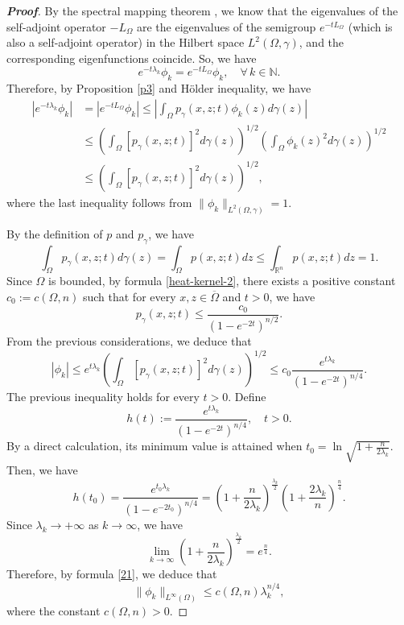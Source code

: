 \documentclass[12pt]{amsart}
\newcommand{\R}{\mathbb R}
\newcommand{\N}{\mathbb N}
\newcommand{\1}{\mathbf 1}
\begin{document}
\begin{proof}[\bf Proof]
 By the spectral mapping theorem \cite[Theorem 2.4]{Pazy1983}, we know that the eigenvalues of the self-adjoint operator $-L_\Omega$ are the eigenvalues of the semigroup $e^{-tL_\Omega}$ (which is also a self-adjoint operator) in the Hilbert space $L^2(\Omega,\gamma)$, and the corresponding eigenfunctions coincide. So, we have
\begin{equation}\label{Section5-1}
e^{-t\lambda_k}\phi_k=e^{-tL_\Omega} \phi_k,\quad\forall\, k\in\N.
\end{equation}
Therefore, by Proposition \ref{p3} and H\"{o}lder inequality, we have
\begin{align*}
|e^{-t\lambda_k}\phi_k|&=|e^{-tL_\Omega} \phi_k|\leq \left|\int_\Omega p_\gamma(x,z;t)\phi_k(z)d\gamma(z)\right|\\
&\leq \left( \int_\Omega [p_\gamma(x,z;t)]^2 d\gamma(z)\right)^{1/2}\left( \int_\Omega \phi_k(z)^2 d\gamma(z)\right)^{1/2}\\
&\leq \left( \int_{\Omega} [p_\gamma(x,z;t)]^2 d\gamma(z)\right)^{1/2},
\end{align*}
where the last inequality follows from $\| \phi_k\|_{L^2(\Omega,\gamma)}=1$.

By the definition of $p$ and $p_\gamma$, we have
\begin{equation}\nonumber
\int_\Omega p_\gamma (x,z;t)d\gamma(z)=\int_\Omega p(x,z;t)dz\leq \int_{\R^n} p(x,z;t)dz =1.
\end{equation}
Since $\Omega$ is bounded, by formula \eqref{heat-kernel-2}, there exists a positive constant $c_0:=c(\Omega,n)$ such that for every $x,z\in \overline{\Omega}$ and $t>0$, we have
\[
p_\gamma(x,z;t)\leq  \frac{c_0}{(1-e^{-2t})^{n/2}} .
\]
From the previous considerations, we deduce that
\begin{equation}\label{21}
|\phi_k|\leq e^{t\lambda_k}\left( \int_\Omega [p_\gamma(x,z;t)]^2 d\gamma(z)\right)^{1/2}\leq c_0\frac{e^{t\lambda_k}}{(1-e^{-2t})^{n/4}}.
\end{equation}
The previous inequality holds for every $t>0$. Define
\[
h(t):=\frac{e^{t\lambda_k}}{(1-e^{-2t})^{n/4}},\quad t>0.
\]
By a direct calculation, its minimum value is attained when $t_0=\ln \sqrt{1+\frac{n}{2\lambda_k}}$. Then, we have
\[
h(t_0)=\frac{e^{t_0\lambda_k}}{(1-e^{-2t_0})^{n/4}}=\left(1+\frac{n}{2\lambda_k} \right)^{\frac{\lambda_k}{2}} \left(1+\frac{2\lambda_k}{n} \right)^{\frac{n}{4}}.
\]
Since $\lambda_k\rightarrow +\infty$ as $k\rightarrow \infty$, we have
\[
\mathop{\lim}_{k\rightarrow \infty}\left(1+\frac{n}{2\lambda_k} \right)^{\frac{\lambda_k}{2}}= e^{\frac{n}{4}}.
\]
Therefore, by formula \eqref{21}, we deduce that
\begin{equation}\nonumber
\| \phi_k\|_{L^{\infty}(\Omega)}\leq c(\Omega,n)\lambda_k^{n/4},
\end{equation}
where the constant $c(\Omega,n)>0$.


\end{proof}
\end{document}
